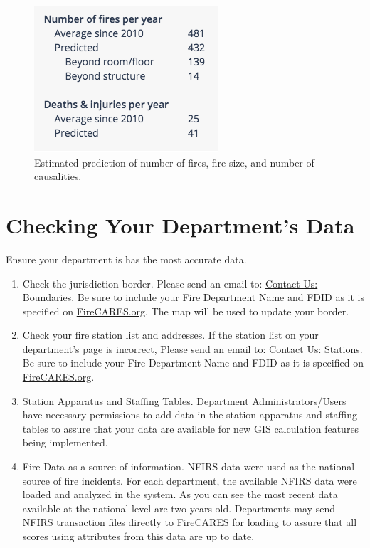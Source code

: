 \documentclass[12pt,oneside]{book}
\begin{document}
\begin{figure}[ht!]
\centering
\includegraphics[width=.5\columnwidth]{Figures/fire_predictions}
\caption{Estimated prediction of number of fires, fire size, and number of causalities.}
\label{fig:fire_predictions}
\end{figure}

\chapter{Checking Your Department's Data}

Ensure your department is has the most accurate data.

\begin{enumerate}
\item Check the jurisdiction border. Please send an email to: \href{mailto:boundaries@firecares.org}{Contact Us: Boundaries}. Be sure to include your Fire Department Name and FDID as it is specified on \href{https://www.FireCARES.org}{FireCARES.org}. The map will be used to update your border.

\item Check your fire station list and addresses. If the station list on your department's page is incorrect, Please send an email to: \href{mailto:stations@firecares.org}{Contact Us: Stations}. Be sure to include your Fire Department Name and FDID as it is specified on \href{https://www.FireCARES.org}{FireCARES.org}.

\item Station Apparatus and Staffing Tables. Department Administrators/Users have necessary permissions to add data in the station apparatus and staffing tables to assure that your data are available for new GIS calculation features being implemented. 

\item Fire Data as a source of information. NFIRS data were used as the national source of fire incidents. For each department, the available NFIRS data were loaded and analyzed in the system.  As you can see the most recent data available at the national level are two years old. Departments may send NFIRS transaction files directly to FireCARES for loading to assure that all scores using attributes from this data are up to date.  

\end{enumerate}
\end{document}
